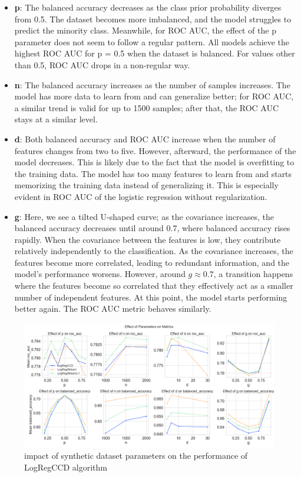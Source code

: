 \documentclass[11pt]{article}
\begin{document}
\begin{itemize}
    \item \textbf{p}: The balanced accuracy decreases as the class prior probability diverges from 0.5. The dataset becomes more imbalanced, and the model struggles to predict the minority class. Meanwhile, for ROC AUC, the effect of the p parameter does not seem to follow a regular pattern. All models achieve the highest ROC AUC for p = 0.5 when the dataset is balanced. For values other than 0.5, ROC AUC drops in a non-regular way.
    \item \textbf{n}: The balanced accuracy increases as the number of samples increases. The model has more data to learn from and can generalize better; for ROC AUC, a similar trend is valid for up to 1500 samples; after that, the ROC AUC stays at a similar level.
    \item \textbf{d}: Both balanced accuracy and ROC AUC increase when the number of features changes from two to five. However, afterward, the performance of the model decreases. This is likely due to the fact that the model is overfitting to the training data. The model has too many features to learn from and starts memorizing the training data instead of generalizing it. This is especially evident in ROC AUC of the logistic regression without regularization.
    \item \textbf{g}: Here, we see a tilted U-shaped curve; as the covariance increases, the balanced accuracy decreases until around 0.7, where balanced accuracy rises rapidly. When the covariance between the features is low, they contribute relatively independently to the classification. As the covariance increases, the features become more correlated, leading to redundant information, and the model's performance worsens. However, around $g \approx 0.7$, a transition happens where the features become so correlated that they effectively act as a smaller number of independent features. At this point, the model starts performing better again. The ROC AUC metric behaves similarly.
    
\end{itemize}

\begin{figure}[h]
    \centering
  \includegraphics[width=\textwidth]{../results/parameter_facet_grid.png}
    \caption{impact of synthetic dataset parameters on the performance of LogRegCCD algorithm}
    \label{fig:synthetic-dataset-parameters}
  \end{figure}
\end{document}
